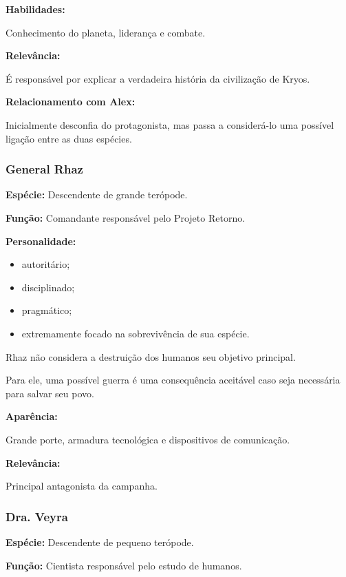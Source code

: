 \documentclass[12pt,a4paper]{article}
\begin{document}
\textbf{Habilidades:}

Conhecimento do planeta, liderança e combate.

\textbf{Relevância:}

É responsável por explicar a verdadeira história da civilização de
Kryos.

\textbf{Relacionamento com Alex:}

Inicialmente desconfia do protagonista, mas passa a considerá-lo uma
possível ligação entre as duas espécies.


\subsubsection*{General Rhaz}

\textbf{Espécie:} Descendente de grande terópode.

\textbf{Função:} Comandante responsável pelo Projeto Retorno.

\textbf{Personalidade:}

\begin{itemize}
    \item autoritário;
    \item disciplinado;
    \item pragmático;
    \item extremamente focado na sobrevivência de sua espécie.
\end{itemize}

Rhaz não considera a destruição dos humanos seu objetivo principal.

Para ele, uma possível guerra é uma consequência aceitável caso seja
necessária para salvar seu povo.

\textbf{Aparência:}

Grande porte, armadura tecnológica e dispositivos de comunicação.

\textbf{Relevância:}

Principal antagonista da campanha.


\subsubsection*{Dra. Veyra}

\textbf{Espécie:} Descendente de pequeno terópode.

\textbf{Função:} Cientista responsável pelo estudo de humanos.
\end{document}
